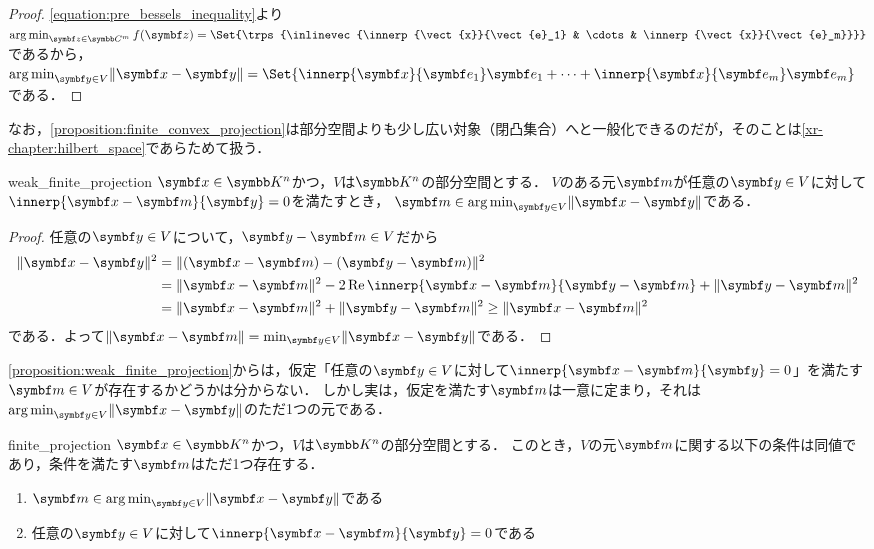 \documentclass[../../main]{subfiles}
\begin{document}
\begin{proof}
  \cref{equation:pre_bessels_inequality}より\(\argmin_{\vect{z}\in\numset{C}^m}f(\vect{z})=\Set{\trps{\inlinevec{\innerp{\vect{x}}{\vect{e}_1} & \cdots & \innerp{\vect{x}}{\vect{e}_m}}}}\)であるから，
  \(\argmin_{\vect{y}\in V}\vnorm{\vect{x}-\vect{y}}=\Set{\innerp{\vect{x}}{\vect{e}_1}\vect{e}_1+\dots+\innerp{\vect{x}}{\vect{e}_m}\vect{e}_m}\)である．
\end{proof}

なお，\cref{proposition:finite_convex_projection}は部分空間よりも少し広い対象（閉凸集合）へと一般化できるのだが，そのことは\cref{xr-chapter:hilbert_space}であらためて扱う．

\begin{proposition}{}{weak_finite_projection}
  \(\vect{x}\in\numset{K}^n\)かつ，\(V\)は\(\numset{K}^n\)の部分空間とする．
  \(V\)のある元\(\vect{m}\)が任意の\(\vect{y}\in V\)に対して\(\innerp{\vect{x}-\vect{m}}{\vect{y}}=0\)を満たすとき，
  \(\vect{m}\in\argmin_{\vect{y}\in V}\vnorm{\vect{x}-\vect{y}}\)である．
\end{proposition}

\begin{proof}
  任意の\(\vect{y}\in V\)について，\(\vect{y}-\vect{m}\in V\)だから
  \begin{align*}
    \vnorm{\vect{x}-\vect{y}}^2 &= \vnorm{(\vect{x}-\vect{m})-(\vect{y}-\vect{m})}^2 \\
    &= \vnorm{\vect{x}-\vect{m}}^2-2\rpart\innerp{\vect{x}-\vect{m}}{\vect{y}-\vect{m}}+\vnorm{\vect{y}-\vect{m}}^2 \\
    &= \vnorm{\vect{x}-\vect{m}}^2+\vnorm{\vect{y}-\vect{m}}^2 \geq \vnorm{\vect{x}-\vect{m}}^2
  \end{align*}
  である．よって\(\vnorm{\vect{x}-\vect{m}}=\min_{\vect{y}\in V}\vnorm{\vect{x}-\vect{y}}\)である．
\end{proof}

\cref{proposition:weak_finite_projection}からは，仮定「任意の\(\vect{y}\in V\)に対して\(\innerp{\vect{x}-\vect{m}}{\vect{y}}=0\)」を満たす\(\vect{m}\in V\)が存在するかどうかは分からない．
しかし実は，仮定を満たす\(\vect{m}\)は一意に定まり，それは\(\argmin_{\vect{y}\in V}\vnorm{\vect{x}-\vect{y}}\)のただ1つの元である．

\begin{proposition}{}{finite_projection}
  \(\vect{x}\in\numset{K}^n\)かつ，\(V\)は\(\numset{K}^n\)の部分空間とする．
  このとき，\(V\)の元\(\vect{m}\)に関する以下の条件は同値であり，条件を満たす\(\vect{m}\)はただ1つ存在する．
  \begin{enumerate}
    \item \(\vect{m}\in\argmin_{\vect{y}\in V}\vnorm{\vect{x}-\vect{y}}\)である
    \item 任意の\(\vect{y}\in V\)に対して\(\innerp{\vect{x}-\vect{m}}{\vect{y}}=0\)である
  \end{enumerate}
\end{proposition}
\end{document}

